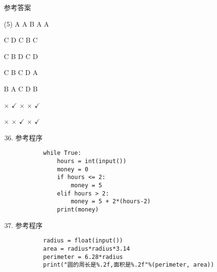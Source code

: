 \documentclass[11pt]{ctexart}
\begin{document}
\begin{center}
    \Huge \heiti 参考答案
\end{center}

    \begin{tasks}[label=\arabic*.](5)
        \task A
        \task A
        \task B
        \task A
        \task A

        \task C
        \task D
        \task C
        \task B
        \task C

        \task C
        \task B
        \task D
        \task C
        \task D

        \task C
        \task B
        \task C
        \task D
        \task A

        \task B
        \task A
        \task C
        \task D
        \task B

        \task $\times$
        \task $\checkmark$
        \task $\times$
        \task $\times$
        \task $\checkmark$

        \task $\times$
        \task $\times$
        \task $\checkmark$
        \task $\times$
        \task $\checkmark$
    \end{tasks}

\begin{enumerate}
    \setcounter{enumi}{35}
    \item 参考程序
    \begin{lstlisting}
        while True:
            hours = int(input())
            money = 0
            if hours <= 2:
                money = 5
            elif hours > 2:
                money = 5 + 2*(hours-2)
            print(money)
    \end{lstlisting}

    \item 参考程序
    \begin{lstlisting}
        radius = float(input())
        area = radius*radius*3.14
        perimeter = 6.28*radius
        print("圆的周长是%.2f,面积是%.2f"%(perimeter, area))
    \end{lstlisting}
\end{enumerate}
\end{document}
